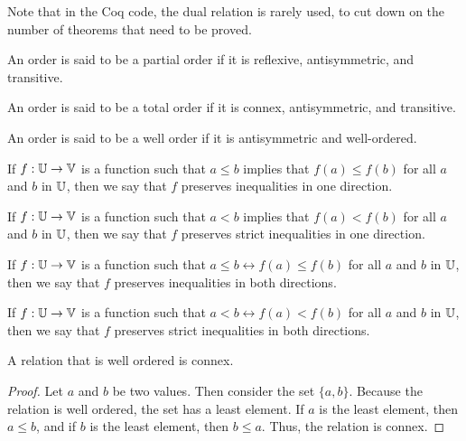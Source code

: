 \documentclass[../../math.tex]{subfiles}
\begin{document}
Note that in the Coq code, the dual relation is rarely used, to cut down on the
number of theorems that need to be proved.

\begin{class}
    An order is said to be a partial order if it is reflexive, antisymmetric,
    and transitive.
\end{class}

\begin{class}
    An order is said to be a total order if it is connex, antisymmetric, and
    transitive.
\end{class}

\begin{class}
    An order is said to be a well order if it is antisymmetric and well-ordered.
\end{class}

\begin{class}
    If $f : \mathbb{U} \to \mathbb{V}$ is a function such that $a \leq b$ implies that $f(a)
    \leq f(b)$ for all $a$ and $b$ in $\mathbb{U}$, then we say that $f$ preserves
    inequalities in one direction.
\end{class}

\begin{class}
    If $f : \mathbb{U} \to \mathbb{V}$ is a function such that $a < b$ implies that $f(a) <
    f(b)$ for all $a$ and $b$ in $\mathbb{U}$, then we say that $f$ preserves strict
    inequalities in one direction.
\end{class}

\begin{class}
    If $f : \mathbb{U} \to \mathbb{V}$ is a function such that $a \leq b \leftrightarrow f(a)
    \leq f(b)$ for all $a$ and $b$ in $\mathbb{U}$, then we say that $f$ preserves
    inequalities in both directions.
\end{class}

\begin{class}
    If $f : \mathbb{U} \to \mathbb{V}$ is a function such that $a < b \leftrightarrow f(a) <
    f(b)$ for all $a$ and $b$ in $\mathbb{U}$, then we say that $f$ preserves strict
    inequalities in both directions.
\end{class}

\begin{instance} \label{wo_connex}
    A relation that is well ordered is connex.
\end{instance}
\begin{proof}
    Let $a$ and $b$ be two values.  Then consider the set $\{a, b\}$.  Because
    the relation is well ordered, the set has a least element.  If $a$ is the
    least element, then $a \leq b$, and if $b$ is the least element, then $b
    \leq a$.  Thus, the relation is connex.
\end{proof}
\end{document}
